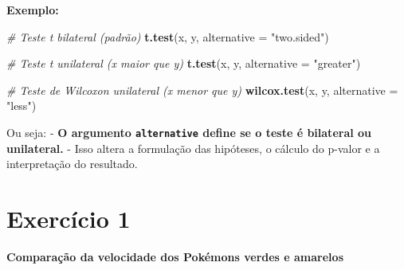 \documentclass[
]{book}
\newenvironment{Shaded}{\begin{snugshade}}{\end{snugshade}}
\newcommand{\AttributeTok}[1]{\textcolor[rgb]{0.13,0.29,0.53}{#1}}
\newcommand{\CommentTok}[1]{\textcolor[rgb]{0.56,0.35,0.01}{\textit{#1}}}
\newcommand{\FunctionTok}[1]{\textcolor[rgb]{0.13,0.29,0.53}{\textbf{#1}}}
\newcommand{\NormalTok}[1]{#1}
\newcommand{\StringTok}[1]{\textcolor[rgb]{0.31,0.60,0.02}{#1}}
\begin{document}
\textbf{Exemplo:}

\begin{Shaded}
\begin{Highlighting}[]
\CommentTok{\# Teste t bilateral (padrão)}
\FunctionTok{t.test}\NormalTok{(x, y, }\AttributeTok{alternative =} \StringTok{"two.sided"}\NormalTok{)}

\CommentTok{\# Teste t unilateral (x maior que y)}
\FunctionTok{t.test}\NormalTok{(x, y, }\AttributeTok{alternative =} \StringTok{"greater"}\NormalTok{)}

\CommentTok{\# Teste de Wilcoxon unilateral (x menor que y)}
\FunctionTok{wilcox.test}\NormalTok{(x, y, }\AttributeTok{alternative =} \StringTok{"less"}\NormalTok{)}
\end{Highlighting}
\end{Shaded}

Ou seja:
- \textbf{O argumento \texttt{alternative} define se o teste é bilateral ou unilateral.}
- Isso altera a formulação das hipóteses, o cálculo do p-valor e a interpretação do resultado.

\section{Exercício 1}\label{exercuxedcio-1}

\textbf{Comparação da velocidade dos Pokémons verdes e amarelos}
\end{document}
